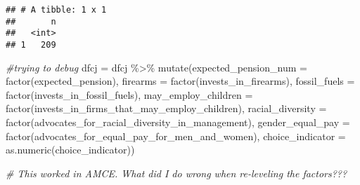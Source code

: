 \documentclass[
]{article}
\newenvironment{Shaded}{\begin{snugshade}}{\end{snugshade}}
\newcommand{\AttributeTok}[1]{\textcolor[rgb]{0.77,0.63,0.00}{#1}}
\newcommand{\CommentTok}[1]{\textcolor[rgb]{0.56,0.35,0.01}{\textit{#1}}}
\newcommand{\FunctionTok}[1]{\textcolor[rgb]{0.00,0.00,0.00}{#1}}
\newcommand{\NormalTok}[1]{#1}
\newcommand{\OtherTok}[1]{\textcolor[rgb]{0.56,0.35,0.01}{#1}}
\newcommand{\SpecialCharTok}[1]{\textcolor[rgb]{0.00,0.00,0.00}{#1}}
\begin{document}
\begin{verbatim}
## # A tibble: 1 x 1
##       n
##   <int>
## 1   209
\end{verbatim}

\begin{Shaded}
\begin{Highlighting}[]
\CommentTok{\#trying to debug}
\NormalTok{dfcj }\OtherTok{=}\NormalTok{ dfcj }\SpecialCharTok{\%\textgreater{}\%} 
  \FunctionTok{mutate}\NormalTok{(}\AttributeTok{expected\_pension\_num =} \FunctionTok{factor}\NormalTok{(expected\_pension),}
         \AttributeTok{firearms =} \FunctionTok{factor}\NormalTok{(invests\_in\_firearms),                              }
         \AttributeTok{fossil\_fuels =}  \FunctionTok{factor}\NormalTok{(invests\_in\_fossil\_fuels),}
         \AttributeTok{may\_employ\_children =} \FunctionTok{factor}\NormalTok{(invests\_in\_firms\_that\_may\_employ\_children), }
         \AttributeTok{racial\_diversity =} \FunctionTok{factor}\NormalTok{(advocates\_for\_racial\_diversity\_in\_management),}
         \AttributeTok{gender\_equal\_pay =} \FunctionTok{factor}\NormalTok{(advocates\_for\_equal\_pay\_for\_men\_and\_women),}
        \AttributeTok{choice\_indicator =} \FunctionTok{as.numeric}\NormalTok{(choice\_indicator))}

\CommentTok{\# This worked in AMCE. What did I do wrong when re{-}leveling the factors???}
\end{Highlighting}
\end{Shaded}

\begin{Shaded}
\end{Shaded}
\end{document}
